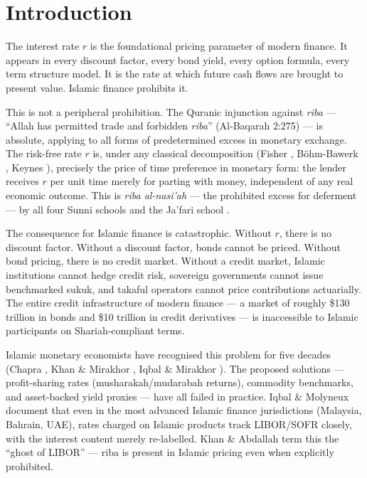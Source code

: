 \documentclass[10pt,twocolumn]{article}
\theoremstyle{plain}
\theoremstyle{definition}
\begin{document}
\section{Introduction}
\label{sec:intro}

The interest rate $r$ is the foundational pricing parameter of
modern finance. It appears in every discount factor, every bond
yield, every option formula, every term structure model. It is the
rate at which future cash flows are brought to present value.
Islamic finance prohibits it.

This is not a peripheral prohibition. The Quranic injunction
against \textit{riba} --- ``Allah has permitted trade and
forbidden \textit{riba}'' (Al-Baqarah 2:275) --- is absolute,
applying to all forms of predetermined excess in monetary exchange.
The risk-free rate $r$ is, under any classical decomposition
(Fisher \cite{Fisher1930}, Böhm-Bawerk \cite{BohmBawerk1890},
Keynes \cite{Keynes1936}), precisely the price of time preference
in monetary form: the lender receives $r$ per unit time merely for
parting with money, independent of any real economic outcome. This
is \textit{riba al-nasi'ah} --- the prohibited excess for deferment
--- by all four Sunni schools and the Ja'fari school
\cite{Usmani2002,ElGamal2006}.

The consequence for Islamic finance is catastrophic. Without $r$,
there is no discount factor. Without a discount factor, bonds
cannot be priced. Without bond pricing, there is no credit market.
Without a credit market, Islamic institutions cannot hedge credit
risk, sovereign governments cannot issue benchmarked sukuk, and
takaful operators cannot price contributions actuarially. The
entire credit infrastructure of modern finance --- a market of
roughly \$130 trillion in bonds and \$10 trillion in credit
derivatives \cite{BIS2024} --- is inaccessible to Islamic
participants on Shariah-compliant terms.

Islamic monetary economists have recognised this problem for
five decades (Chapra \cite{Chapra1985}, Khan \& Mirakhor
\cite{KhanMirakhor1987}, Iqbal \& Mirakhor \cite{IqbalMirakhor2011}).
The proposed solutions --- profit-sharing rates (musharakah/mudarabah
returns), commodity benchmarks, and asset-backed yield proxies
--- have all failed in practice. Iqbal \& Molyneux
\cite{IqbalMolyneux2005} document that even in the most
advanced Islamic finance jurisdictions (Malaysia, Bahrain,
UAE), rates charged on Islamic products track LIBOR/SOFR
closely, with the interest content merely re-labelled.
Khan \& Abdallah \cite{KhanAbdallah2017} term this the
``ghost of LIBOR'' --- riba is present in Islamic pricing
even when explicitly prohibited.
\end{document}
